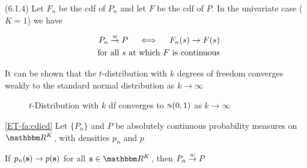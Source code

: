 \begin{frame}

    \vspace{2em}
    \Fact(6.1.4)
    Let $F_n$ be the {\sc cdf} of $P_n$ and let $F$ be the {\sc cdf} of $P$.
    In the univariate case ($K=1$) we have 
    
    \begin{align*}
        P_n \stackrel { w } {\to} P 
        \quad \iff \quad
        F_n(s) \to F(s) 
        \\ \; \text{ for all $s$ at which $F$ is continuous}
    \end{align*}

    \vspace{1em}
    \Eg
        It can be shown that the $t$-distribution with $k$ degrees of freedom
        converges weakly to the standard normal distribution as $k \to \infty$
    
\end{frame}

    \vspace{2em}
    \begin{frame}
        \begin{figure}
       \begin{center}
        \caption{\label{f:t_to_norm} $t$-Distribution with $k$ df converges to $\textrm{\sc n}(0,1)$ as $k \to \infty$}
       \end{center}
    \end{figure}
      
\end{frame}

\begin{frame}

    \vspace{2em}
    \Fact\eqref{ET-fa:cdicd}
    Let $\{P_n\}$ and $P$ be absolutely continuous probability measures on
    $\RR^K$, with densities $p_n$ and $p$
    
    If $p_n({\mathbf s}) \to p({\mathbf s})$ for all
    $\bolds \in \RR^K$, then $P_n \stackrel { w } {\to} P$

\end{frame}

